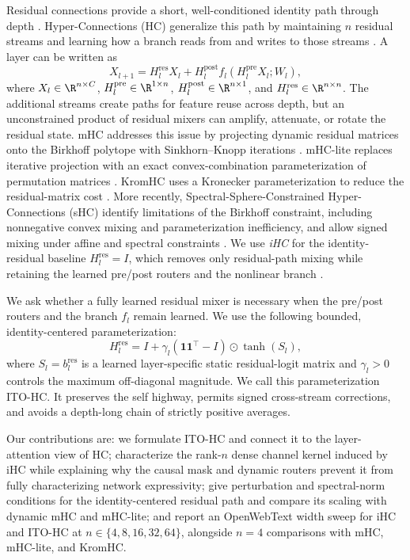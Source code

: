 \documentclass{article}
\newcommand{\Hpre}{H^{\mathrm{pre}}}
\newcommand{\Hpost}{H^{\mathrm{post}}}
\newcommand{\Hres}{H^{\mathrm{res}}}
\begin{document}
Residual connections provide a short, well-conditioned identity path through depth \citep{he2016deep}. Hyper-Connections (HC) generalize this path by maintaining $n$ residual streams and learning how a branch reads from and writes to those streams \citep{zhu2024hyper}. A layer can be written as
\begin{equation}
 X_{l+1}=\Hres_l X_l+\Hpost_l f_l(\Hpre_l X_l;W_l),
 \label{eq:hc}
\end{equation}
where $X_l\in\R^{n\times C}$, $\Hpre_l\in\R^{1\times n}$, $\Hpost_l\in\R^{n\times 1}$, and $\Hres_l\in\R^{n\times n}$. The additional streams create paths for feature reuse across depth, but an unconstrained product of residual mixers can amplify, attenuate, or rotate the residual state. mHC addresses this issue by projecting dynamic residual matrices onto the Birkhoff polytope with Sinkhorn--Knopp iterations \citep{xie2026mhc}. mHC-lite replaces iterative projection with an exact convex-combination parameterization of permutation matrices \citep{yang2026mhclite}. KromHC uses a Kronecker parameterization to reduce the residual-matrix cost \citep{zhou2026kromhc}. More recently, Spectral-Sphere-Constrained Hyper-Connections (sHC) identify limitations of the Birkhoff constraint, including nonnegative convex mixing and parameterization inefficiency, and allow signed mixing under affine and spectral constraints \citep{liu2026shc}.
We use \emph{iHC} for the identity-residual baseline $\Hres_l=I$, which removes only residual-path mixing while retaining the learned pre/post routers and the nonlinear branch \citep{guo2026ohc}.

We ask whether a fully learned residual mixer is necessary when the pre/post routers and the branch $f_l$ remain learned. We use the following bounded, identity-centered parameterization:
\begin{equation}
 \Hres_l=I+\gamma_l(\mathbf 1\mathbf 1^\top-I)\odot\tanh(S_l),
 \label{eq:method-short}
\end{equation}
where $S_l=b_l^{\mathrm{res}}$ is a learned layer-specific static residual-logit matrix and $\gamma_l>0$ controls the maximum off-diagonal magnitude. We call this parameterization ITO-HC. It preserves the self highway, permits signed cross-stream corrections, and avoids a depth-long chain of strictly positive averages.

Our contributions are: we formulate ITO-HC and connect it to the layer-attention view of HC; characterize the rank-$n$ dense channel kernel induced by iHC while explaining why the causal mask and dynamic routers prevent it from fully characterizing network expressivity; give perturbation and spectral-norm conditions for the identity-centered residual path and compare its scaling with dynamic mHC and mHC-lite; and report an OpenWebText width sweep for iHC and ITO-HC at $n\in\{4,8,16,32,64\}$, alongside $n=4$ comparisons with mHC, mHC-lite, and KromHC.
\end{document}
